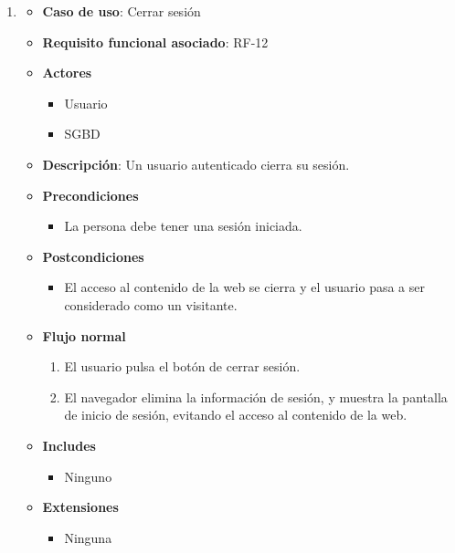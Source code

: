 \begin{enumerate}
\item %
  \begin{itemize}
  \item \textbf{Caso de uso}: Cerrar sesión
  \item \textbf{Requisito funcional asociado}: RF-12
  \item \textbf{Actores}
    \begin{itemize}
    \item Usuario
    \item SGBD
    \end{itemize}
  \item \textbf{Descripción}: Un usuario autenticado cierra su sesión.
  \item \textbf{Precondiciones}
    \begin{itemize}
    \item La persona debe tener una sesión iniciada.
    \end{itemize}
  \item \textbf{Postcondiciones}
    \begin{itemize}
    \item El acceso al contenido de la web se cierra y el usuario pasa a ser considerado como un visitante.
    \end{itemize}
  \item \textbf{Flujo normal}
    \begin{enumerate}
    \item El usuario pulsa el botón de cerrar sesión.
    \item El navegador elimina la información de sesión, y muestra la pantalla de inicio de sesión, evitando el acceso al contenido de la web.
    \end{enumerate}
  \item \textbf{Includes}
    \begin{itemize}
    \item Ninguno
    \end{itemize}
  \item \textbf{Extensiones}
    \begin{itemize}
    \item Ninguna
    \end{itemize}
  \end{itemize}


\end{enumerate}
